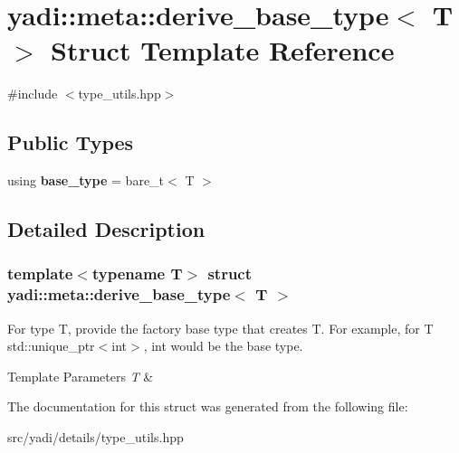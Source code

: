 \hypertarget{structyadi_1_1meta_1_1derive__base__type}{}\section{yadi\+:\+:meta\+:\+:derive\+\_\+base\+\_\+type$<$ T $>$ Struct Template Reference}
\label{structyadi_1_1meta_1_1derive__base__type}


{\ttfamily \#include $<$type\+\_\+utils.\+hpp$>$}

\subsection*{Public Types}
\begin{DoxyCompactItemize}
\item 
\mbox{\label{structyadi_1_1meta_1_1derive__base__type_a90b70b03e448a160fab74a151cd871a5}} 
using {\bfseries base\+\_\+type} = bare\+\_\+t$<$ T $>$
\end{DoxyCompactItemize}


\subsection{Detailed Description}
\subsubsection*{template$<$typename T$>$\newline
struct yadi\+::meta\+::derive\+\_\+base\+\_\+type$<$ T $>$}

For type T, provide the factory base type that creates T. For example, for T std\+::unique\+\_\+ptr$<$int$>$, int would be the base type. 
\begin{DoxyTemplParams}{Template Parameters}
{\em T} & \\
\hline
\end{DoxyTemplParams}


The documentation for this struct was generated from the following file\+:\begin{DoxyCompactItemize}
\item 
src/yadi/details/type\+\_\+utils.\+hpp\end{DoxyCompactItemize}
